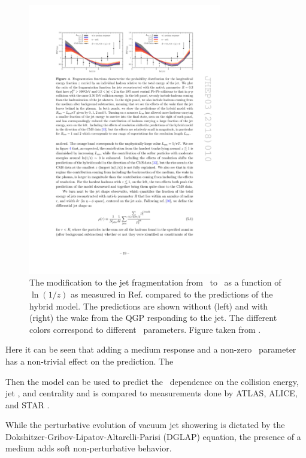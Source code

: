 \begin{figure}[htbp]
\begin{center}
\includegraphics[width=0.75\textwidth]{figures/jetMeasurements/HM_FF}
\caption{The modification to the jet fragmentation from \pp\ to \pbpb\ as a function of $\ln(1/z)$ as measured in Ref. \cite{Khachatryan:2016jfl} compared to the predictions of the hybrid model. The predictions are shown without (left) and with (right) the wake from the QGP responding to the jet. The different colors correspond to different \Lres\ parameters. Figure taken from \cite{Hulcher:2017cpt}. }
\label{fig:hm_ff}
\end{center}
\end{figure}

Here it can be seen that adding a medium response and a non-zero \Lres\ parameter has a non-trivial effect on the prediction. The 

Then the model can be used to predict the \RAA\ dependence on the collision energy, jet \pt,  and centrality and is compared to measurements done by ATLAS, ALICE, and STAR \cite{2013220, Abelev:2013kqa, RUSNAK:2014xfa}.




While the perturbative evolution of vacuum jet showering is dictated by the Dokshitzer-Gribov-Lipatov-Altarelli-Parisi (DGLAP) equation, the presence of a medium adds soft non-perturbative behavior. 



